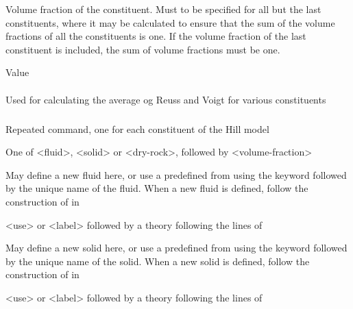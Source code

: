 {
 \slist
   \item \Description Volume fraction of the constituent. Must to be specified for all but the last constituents, where it may be calculated to ensure that the sum of the volume fractions of all the constituents is one. If the volume fraction of the last constituent is included, the sum of volume fractions must be one. 
   \item \Argument Value
   \item \Default
 \elist

\paragraph{}
 \slist
   \item \Description Used for calculating the average og Reuss and Voigt for various constituents
   \item \Argument
   \item \Default 
 \elist

\subparagraph{}
 \slist
   \item \Description Repeated command, one for each constituent of the Hill model
   \item \Argument One of <fluid>, <solid> or <dry-rock>, followed by <volume-fraction>
   \item \Default
 \elist

 \slist
   \item \Description May define a new fluid here, or use a predefined  from  using the keyword  followed by the unique name of the fluid. When a new fluid is defined, follow the construction of  in 
   \item \Argument <use> or <label> followed by a theory following the lines of 
   \item \Default
 \elist

 \slist
   \item \Description May define a new solid here, or use a predefined  from  using the keyword  followed by the unique name of the solid. When a new solid is defined, follow the construction of  in 
   \item \Argument <use> or <label> followed by a theory following the lines of 
   \item \Default
 \elist

}
